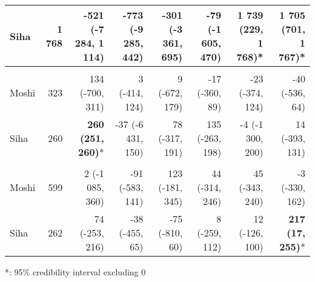 \begin{table}[t]
\begin{tabular*}{\linewidth}{@{\extracolsep{\fill}}l|rrrrrrr}
Siha & 1 768 & -521 (-7 284, 1 114) & -773 (-9 285, 442) & -301 (-3 361, 695) & -79 (-1 605, 470) & \textbf{1 739 (229, 1 768)}* & \textbf{1 705 (701, 1 767)}* \\ 
\midrule\addlinespace[2.5pt]
\multicolumn{8}{l}{Leprosy} \\[2.5pt] 
\midrule\addlinespace[2.5pt]
Moshi & 323 & 134 (-700, 311) & 3 (-414, 124) & 9 (-672, 179) & -17 (-360, 89) & -23 (-374, 124) & -40 (-536, 64) \\ 
Siha & 260 & \textbf{260 (251, 260)}* & -37 (-6 431, 150) & 78 (-317, 191) & 135 (-263, 198) & -4 (-1 300, 200) & 14 (-393, 131) \\ 
\midrule\addlinespace[2.5pt]
\multicolumn{8}{l}{Schistosomiasis} \\[2.5pt] 
\midrule\addlinespace[2.5pt]
Moshi & 599 & 2 (-1 085, 360) & -91 (-583, 141) & 123 (-181, 345) & 44 (-314, 246) & 45 (-343, 240) & -3 (-330, 162) \\ 
Siha & 262 & 74 (-253, 216) & -38 (-455, 65) & -75 (-810, 60) & 8 (-259, 112) & 12 (-126, 100) & \textbf{217 (17, 255)}* \\ 
\bottomrule
\end{tabular*}
\begin{minipage}{\linewidth}
*: 95\% credibility interval excluding 0\\
\end{minipage}
\end{table}

